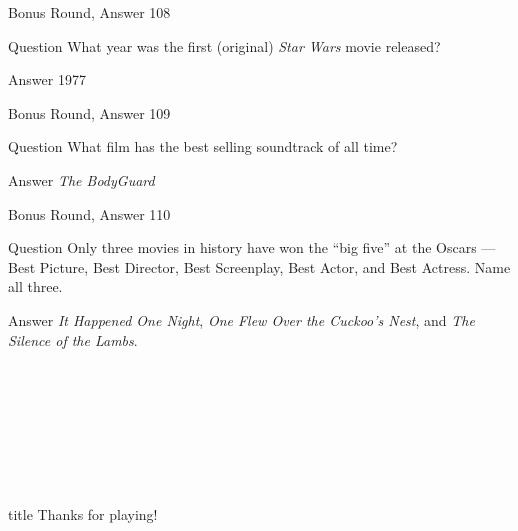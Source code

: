 \documentclass[11pt]{beamer}
\begin{document}
\begin{frame}[t]{Bonus Round, Answer 108}
\vspace{2em}
\begin{block}{Question}
What year was the first (original) \emph{Star Wars} movie released?
\end{block}
\pause{}
\begin{block}{Answer}
1977
\end{block}
\end{frame}
    

\begin{frame}[t]{Bonus Round, Answer 109}
\vspace{2em}
\begin{block}{Question}
What film has the best selling soundtrack of all time?
\end{block}
\pause{}
\begin{block}{Answer}
\emph{The BodyGuard}
\end{block}
\end{frame}
    

\begin{frame}[t]{Bonus Round, Answer 110}
\vspace{2em}
\begin{block}{Question}
Only three movies in history have won the ``big five'' at the Oscars — Best Picture, Best Director, Best Screenplay, Best Actor, and Best Actress. Name all three.
\end{block}
\pause{}
\begin{block}{Answer}
\emph{It Happened One Night}, \emph{One Flew Over the Cuckoo's Nest}, and \emph{The Silence of the Lambs}.
\end{block}
\end{frame}
    

\section*{\ }
\subsection*{\ }
\begingroup{}
\begin{frame}
\vfill{}
\centering{}
\begin{beamercolorbox}[sep=8pt,center,shadow=true,rounded=true]{title}
Thanks for playing!\par%
\end{beamercolorbox}
\vfill{}
\end{frame}
\endgroup{}
\end{document}
